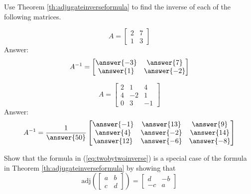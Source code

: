 \documentclass{ximera}
\begin{document}
\begin{problem}
Use Theorem \ref{th:adjugateinverseformula} to find the inverse of each of the following matrices.
  \begin{problem}\label{prob:adjinverse1}
  $$A=\begin{bmatrix}2&7\\1&3\end{bmatrix}$$
  Answer:
  $$A^{-1}=\begin{bmatrix}\answer{-3}&\answer{7}\\\answer{1}&\answer{-2}\end{bmatrix}$$
  \end{problem}
  
  \begin{problem}\label{prob:adjinverse2}
  $$A=\begin{bmatrix}2&1&4\\4&-2&1\\0&3&-1\end{bmatrix}$$
  Answer:
  $$A^{-1}=\frac{1}{\answer{50}}\begin{bmatrix}\answer{-1}&\answer{13}&\answer{9}\\\answer{4}&\answer{-2}&\answer{14}\\\answer{12}&\answer{-6}&\answer{-8}\end{bmatrix}$$
  \end{problem}
\end{problem}

\begin{problem}\label{prob:2by2adjugate}
Show that the formula in (\ref{eq:twobytwoinverse}) is a special case of the formula in Theorem \ref{th:adjugateinverseformula} by showing that 
$$\mbox{adj}\left(\begin{bmatrix}a&b\\c&d\end{bmatrix}\right)=\begin{bmatrix}d&-b\\-c&a\end{bmatrix}$$
\end{problem}
\end{document}

